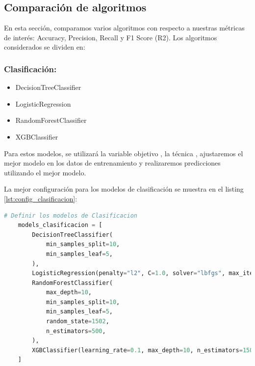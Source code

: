 \subsection{Comparación de algoritmos}

En esta sección, comparamos varios algoritmos con respecto a nuestras métricas de interés: Accuracy, Precision, Recall y F1 Score (R2). Los algoritmos considerados se dividen en:


\subsubsection{Clasificación:}

\begin{itemize}
    \item DecisionTreeClassifier
    \item LogisticRegression
    \item RandomForestClassifier
    \item XGBClassifier
\end{itemize}

Para estos modelos, se utilizará la variable objetivo , la técnica , ajustaremos el mejor modelo en los datos de entrenamiento y realizaremos predicciones utilizando el mejor modelo.

La mejor configuración para los modelos de clasificación se muestra en el listing \ref{lst:config_clasificacion}:


\begin{lstlisting}[language=Python, caption=Definicion de los Modelos de Clasificación,label=lst:config_clasificacion]
    # Definir los modelos de Clasificacion
    models_clasificacion = [
        DecisionTreeClassifier(
            min_samples_split=10,
            min_samples_leaf=5,
        ),
        LogisticRegression(penalty="l2", C=1.0, solver="lbfgs", max_iter=150),
        RandomForestClassifier(
            max_depth=10,
            min_samples_split=10,
            min_samples_leaf=5,
            random_state=1502,
            n_estimators=500,
        ),
        XGBClassifier(learning_rate=0.1, max_depth=10, n_estimators=150, subsample=1.0),
    ]
\end{lstlisting}

